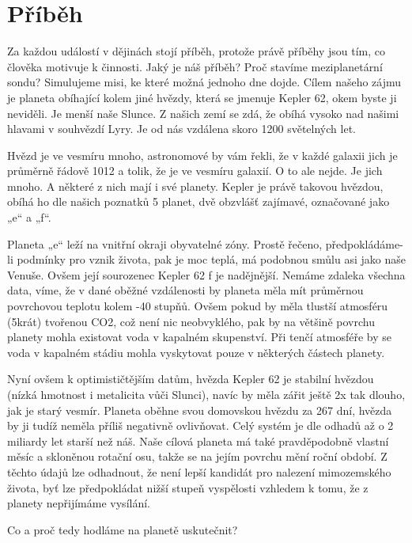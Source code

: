 \documentclass{article}
\begin{document}
\section{Příběh}
\item Za každou událostí v dějinách stojí příběh, protože právě příběhy jsou tím, co člověka motivuje k činnosti. Jaký je náš příběh? Proč stavíme meziplanetární sondu? Simulujeme misi, ke které možná jednoho dne dojde. Cílem našeho zájmu je planeta obíhající kolem jiné hvězdy, která se jmenuje Kepler 62, okem byste ji neviděli. Je menší naše Slunce. Z našich zemí se zdá, že obíhá vysoko nad našimi hlavami v souhvězdí Lyry. Je od nás vzdálena skoro 1200 světelných let. 
\item Hvězd je ve vesmíru mnoho, astronomové by vám řekli, že v každé galaxii jich je průměrně řádově 1012 a tolik, že je ve vesmíru galaxií. O to ale nejde. Je jich mnoho. A některé z nich mají i své planety. Kepler je právě takovou hvězdou, obíhá ho dle našich poznatků 5 planet, dvě obzvlášť zajímavé, označované jako „e“ a „f“. 
\item Planeta „e“ leží na vnitřní okraji obyvatelné zóny. Prostě řečeno, předpokládáme-li podmínky pro vznik života, pak je moc teplá, má podobnou smůlu asi jako naše Venuše. Ovšem její sourozenec Kepler 62 f je nadějnější. Nemáme zdaleka všechna data, víme, že v dané oběžné vzdálenosti by planeta měla mít průměrnou povrchovou teplotu kolem -40 stupňů. Ovšem pokud by měla tlustší atmosféru (5krát) tvořenou CO2, což není nic neobvyklého, pak by na většině povrchu planety mohla existovat voda v kapalném skupenství. Při tenčí atmosféře by se voda v kapalném stádiu mohla vyskytovat pouze v některých částech planety.
\item Nyní ovšem k optimističtějším datům, hvězda Kepler 62 je stabilní hvězdou (nízká hmotnost i metalicita vůči Slunci), navíc by měla zářit ještě 2x tak dlouho, jak je starý vesmír. Planeta oběhne svou domovskou hvězdu za 267 dní, hvězda by ji tudíž neměla příliš negativně ovlivňovat. Celý systém je dle odhadů až o 2 miliardy let starší než náš. Naše cílová planeta má také pravděpodobně vlastní měsíc a skloněnou rotační osu, takže se na jejím povrchu mění roční období. Z těchto údajů lze odhadnout, že není lepší kandidát pro nalezení mimozemského života, byť lze předpokládat nižší stupeň vyspělosti vzhledem k tomu, že z planety nepřijímáme vysílání.
\item Co a proč tedy hodláme na planetě uskutečnit?
\end{document}
